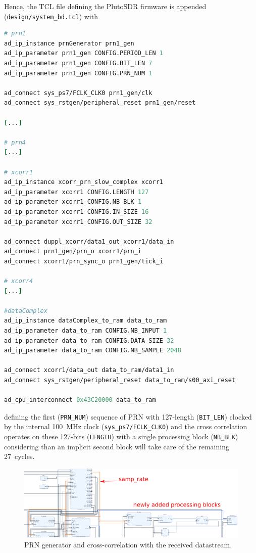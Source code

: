 \documentclass{article}
\begin{document}
Hence, the TCL file defining the PlutoSDR firmware is appended ({\tt design/system\_bd.tcl}) with
\begin{lstlisting}[language=TCL]
# prn1
ad_ip_instance prnGenerator prn1_gen
ad_ip_parameter prn1_gen CONFIG.PERIOD_LEN 1
ad_ip_parameter prn1_gen CONFIG.BIT_LEN 7
ad_ip_parameter prn1_gen CONFIG.PRN_NUM 1

ad_connect sys_ps7/FCLK_CLK0 prn1_gen/clk
ad_connect sys_rstgen/peripheral_reset prn1_gen/reset

[...]

# prn4
[...]

# xcorr1
ad_ip_instance xcorr_prn_slow_complex xcorr1
ad_ip_parameter xcorr1 CONFIG.LENGTH 127
ad_ip_parameter xcorr1 CONFIG.NB_BLK 1
ad_ip_parameter xcorr1 CONFIG.IN_SIZE 16
ad_ip_parameter xcorr1 CONFIG.OUT_SIZE 32

ad_connect duppl_xcorr/data1_out xcorr1/data_in
ad_connect prn1_gen/prn_o xcorr1/prn_i
ad_connect xcorr1/prn_sync_o prn1_gen/tick_i

# xcorr4
[...]

#dataComplex
ad_ip_instance dataComplex_to_ram data_to_ram
ad_ip_parameter data_to_ram CONFIG.NB_INPUT 1
ad_ip_parameter data_to_ram CONFIG.DATA_SIZE 32
ad_ip_parameter data_to_ram CONFIG.NB_SAMPLE 2048

ad_connect xcorr1/data_out data_to_ram/data1_in
ad_connect sys_rstgen/peripheral_reset data_to_ram/s00_axi_reset

ad_cpu_interconnect 0x43C20000 data_to_ram
\end{lstlisting}
defining the first ({\tt PRN\_NUM}) sequence of PRN with 127-length ({\tt BIT\_LEN}) clocked
by the internal 100~MHz clock ({\tt sys\_ps7/FCLK\_CLK0}) and the cross correlation
operates on these 127-bits ({\tt LENGTH}) with a single processing block ({\tt NB\_BLK}) considering
than an implicit second block will take care of the remaining 27~cycles.

\begin{figure}[h!tb]
\includegraphics[width=\linewidth]{1xcorr_1PRN_crop.pdf}
\caption{PRN generator and cross-correlation with the received datastream.}
\label{ex1}
\end{figure}
\end{document}
